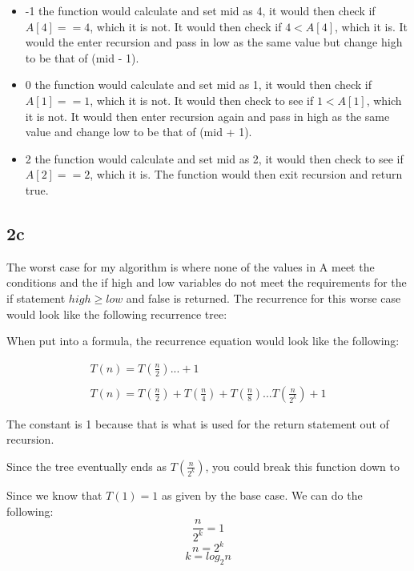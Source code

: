 \documentclass[oneside, a4paper]{article}
\begin{document}
\begin{itemize}
    \item -1 \textrightarrow the function would calculate and set mid as 4, it would then check if $A[4] == 4$, which it is not. It would then check if $4 < A[4]$, which it is. It would the enter recursion and pass in low as the same value but change high to be that of (mid - 1). 
    \item 0 \textrightarrow the function would calculate and set mid as 1, it would then check if $A[1] == 1$, which it is not. It would then check to see if $1 < A[1]$, which it is not. It would then enter recursion again and pass in high as the same value and change low to be that of (mid + 1). 
    \item 2 \textrightarrow the function would calculate and set mid as 2, it would then check to see if $A[2] == 2$, which it is. The function would then exit recursion and return true.
\end{itemize}

\subsection{2c}
The worst case for my algorithm is where none of the values in A meet the conditions and the if high and low variables do not meet the requirements for the if statement $high \geq low$ and false is returned. The recurrence for this worse case would look like the following recurrence tree:



When put into a formula, the recurrence equation would look like the following:

\begin{equation}
    \begin{array}{l}
        T(n) = T(\frac{n}{2}) ... + 1\\\\
        T(n) = T(\frac{n}{2}) + T(\frac{n}{4}) + T(\frac{n}{8}) ... T(\frac{n}{2^k}) + 1
      \end{array}
\end{equation}

The constant is 1 because that is what is used for the return statement out of recursion. 

Since the tree eventually ends as $T(\frac{n}{2^k})$, you could break this function down to 

Since we know that $T(1) = 1$ as given by the base case. We can do the following:
$$\frac{n}{2^k} = 1$$
$$n = 2^k$$
$$k = log_2n$$
\end{document}
